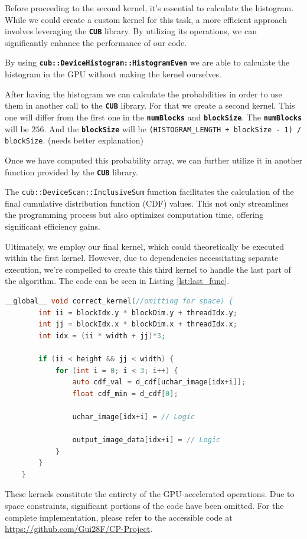 \documentclass[sigconf]{acmart}
\begin{document}
Before proceeding to the second kernel, it's essential to calculate the histogram. While we could create a custom kernel for this task, a more efficient approach involves leveraging the \texttt{\textbf{CUB}} library. By utilizing its operations, we can significantly enhance the performance of our code.

By using \texttt{\textbf{cub::DeviceHistogram::HistogramEven}} we are able to calculate the histogram in the GPU without making the kernel ourselves.

After having the histogram we can calculate the probabilities in order to use them in another call to the \texttt{\textbf{CUB}} library. For that we create a second kernel. This one will differ from the first one in the \texttt{\textbf{numBlocks}} and \texttt{\textbf{blockSize}}. The \texttt{\textbf{numBlocks}} will be $256$. And the \texttt{\textbf{blockSize}} will be \texttt{(HISTOGRAM\_LENGTH + blockSize - 1) / blockSize}. (needs better explanation)

Once we have computed this probability array, we can further utilize it in another function provided by the \texttt{\textbf{CUB}}  library.

The \texttt{cub::DeviceScan::InclusiveSum} function facilitates the calculation of the final cumulative distribution function (CDF) values. This not only streamlines the programming process but also optimizes computation time, offering significant efficiency gains.

Ultimately, we employ our final kernel, which could theoretically be executed within the first kernel. However, due to dependencies necessitating separate execution, we're compelled to create this third kernel to handle the last part of the algorithm. The code can be seen in Listing \ref{lst:last_func}.

\begin{lstlisting}[language=C, caption=Correct and Rescale, label={lst:last_func}]
 __global__ void correct_kernel(//omitting for space) {
        int ii = blockIdx.y * blockDim.y + threadIdx.y;
        int jj = blockIdx.x * blockDim.x + threadIdx.x;
        int idx = (ii * width + jj)*3;

        if (ii < height && jj < width) {
            for (int i = 0; i < 3; i++) {
                auto cdf_val = d_cdf[uchar_image[idx+i]];
                float cdf_min = d_cdf[0];
                
                uchar_image[idx+i] = // Logic

                output_image_data[idx+i] = // Logic
            }
        }
    }
\end{lstlisting}
These kernels constitute the entirety of the GPU-accelerated operations. Due to space constraints, significant portions of the code have been omitted. For the complete implementation, please refer to the accessible code at \url{https://github.com/Gui28F/CP-Project}. 
\end{document}
